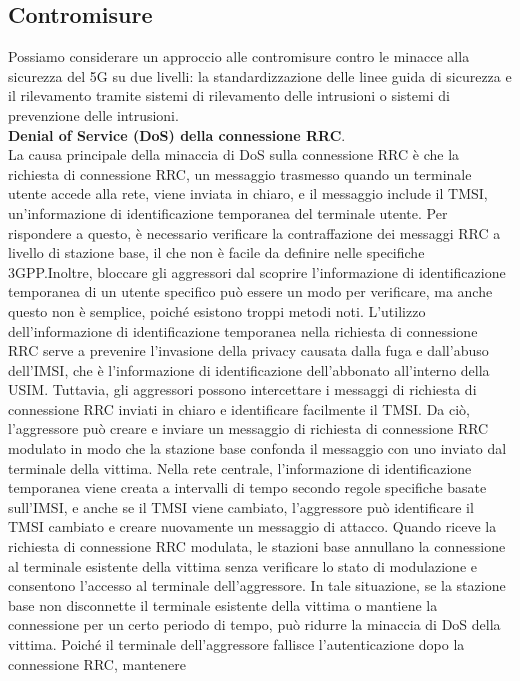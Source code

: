 \documentclass[english]{article}
\begin{document}
\subsection{Contromisure}
Possiamo considerare un approccio alle contromisure contro le minacce alla
sicurezza del 5G su due livelli: la standardizzazione delle linee guida di
sicurezza e il rilevamento tramite sistemi di rilevamento delle intrusioni o
sistemi di prevenzione delle intrusioni. \\[0.2cm]
\textbf{Denial of Service (DoS) della connessione RRC}.\@ \\
La causa principale della minaccia di DoS sulla connessione
RRC è che la richiesta di connessione RRC, un messaggio trasmesso quando un terminale
utente accede alla rete, viene inviata in chiaro, e il messaggio include il TMSI,
un'informazione di identificazione temporanea del terminale utente. Per rispondere
a questo, è necessario verificare la contraffazione dei messaggi RRC a livello di
stazione base, il che non è facile da definire nelle specifiche 3GPP.\@ Inoltre,
bloccare gli aggressori dal scoprire l'informazione di identificazione temporanea
di un utente specifico può essere un modo per verificare, ma anche questo non è
semplice, poiché esistono troppi metodi noti. L'utilizzo dell'informazione di
identificazione temporanea nella richiesta di connessione RRC serve a prevenire
l'invasione della privacy causata dalla fuga e dall'abuso dell'IMSI, che è
l'informazione di identificazione dell'abbonato all'interno della USIM. Tuttavia,
gli aggressori possono intercettare i messaggi di richiesta di connessione RRC
inviati in chiaro e identificare facilmente il TMSI. Da ciò, l'aggressore può creare
e inviare un messaggio di richiesta di connessione RRC modulato in modo che la
stazione base confonda il messaggio con uno inviato dal terminale della vittima.
Nella rete centrale, l'informazione di identificazione temporanea viene creata a
intervalli di tempo secondo regole specifiche basate sull'IMSI, e anche se il
TMSI viene cambiato, l'aggressore può identificare il TMSI cambiato e creare
nuovamente un messaggio di attacco. Quando riceve la richiesta di connessione
RRC modulata, le stazioni base annullano la connessione al terminale esistente
della vittima senza verificare lo stato di modulazione e consentono l'accesso
al terminale dell'aggressore. In tale situazione, se la stazione base non disconnette
il terminale esistente della vittima o mantiene la connessione per un certo periodo
di tempo, può ridurre la minaccia di DoS della vittima. Poiché il terminale
dell'aggressore fallisce l'autenticazione dopo la connessione RRC, mantenere
\end{document}
